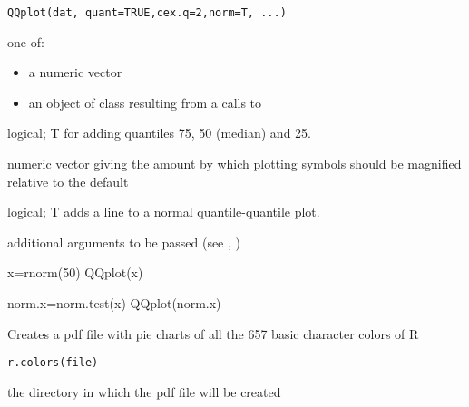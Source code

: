 \documentclass[a4paper]{book}
\begin{document}
\newpage
{}
%
\begin{Usage}
\begin{verbatim}
QQplot(dat, quant=TRUE,cex.q=2,norm=T, ...)
\end{verbatim}
\end{Usage}
%
\begin{Arguments}
\begin{ldescription}
\item[\code{dat}] one of:
\begin{itemize}

\item a numeric vector
\item an object of class  resulting from a
calls to 

\end{itemize}


\item[\code{quant}] logical; T for adding quantiles 75, 50 (median) and 25.
\item[\code{cex.q}] numeric vector giving the amount by which plotting symbols should be magnified relative to the default
\item[\code{norm}] logical; T adds a line to a normal quantile-quantile plot.
\item[\code{...}] additional arguments to be passed (see , )
\end{ldescription}
\end{Arguments}
%
\begin{Examples}
\begin{ExampleCode}
x=rnorm(50)
QQplot(x)

norm.x=norm.test(x)
QQplot(norm.x)  
\end{ExampleCode}
\end{Examples}
\newpage
{}
%
\begin{Description}\relax
Creates a pdf file with pie charts of all the 657 basic character colors of R
\end{Description}
%
\begin{Usage}
\begin{verbatim}
r.colors(file)
\end{verbatim}
\end{Usage}
%
\begin{Arguments}
\begin{ldescription}
\item[\code{file}] 
the directory in which the pdf file will be created


\end{ldescription}
\end{Arguments}
\end{document}
